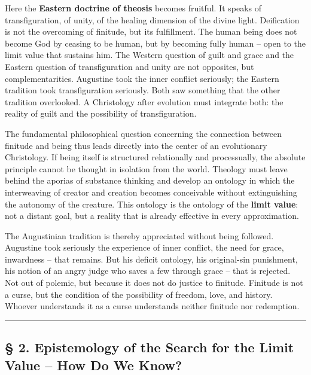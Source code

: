 \documentclass[
  english,
]{article}
\begin{document}
Here the \textbf{Eastern doctrine of theosis} becomes fruitful. It
speaks of transfiguration, of unity, of the healing dimension of the
divine light. Deification is not the overcoming of finitude, but its
fulfillment. The human being does not become God by ceasing to be human,
but by becoming fully human -- open to the limit value that sustains
him. The Western question of guilt and grace and the Eastern question of
transfiguration and unity are not opposites, but complementarities.
Augustine took the inner conflict seriously; the Eastern tradition took
transfiguration seriously. Both saw something that the other tradition
overlooked. A Christology after evolution must integrate both: the
reality of guilt and the possibility of transfiguration.

The fundamental philosophical question concerning the connection between
finitude and being thus leads directly into the center of an
evolutionary Christology. If being itself is structured relationally and
processually, the absolute principle cannot be thought in isolation from
the world. Theology must leave behind the aporias of substance thinking
and develop an ontology in which the interweaving of creator and
creation becomes conceivable without extinguishing the autonomy of the
creature. This ontology is the ontology of the \textbf{limit value}: not
a distant goal, but a reality that is already effective in every
approximation.

The Augustinian tradition is thereby appreciated without being followed.
Augustine took seriously the experience of inner conflict, the need for
grace, inwardness -- that remains. But his deficit ontology, his
original-sin punishment, his notion of an angry judge who saves a few
through grace -- that is rejected. Not out of polemic, but because it
does not do justice to finitude. Finitude is not a curse, but the
condition of the possibility of freedom, love, and history. Whoever
understands it as a curse understands neither finitude nor redemption.

\begin{center}\rule{0.5\linewidth}{0.5pt}\end{center}

\subsection{§ 2. Epistemology of the Search for the Limit Value -- How
Do We
Know?}\label{epistemology-of-the-search-for-the-limit-value-how-do-we-know}
\end{document}

